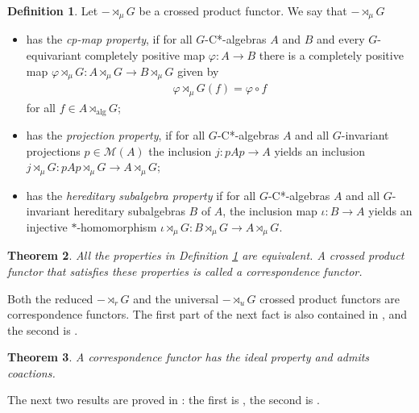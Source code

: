 \documentclass[12pt]{amsart}
\newtheorem{thm}{Theorem}[section]
\theoremstyle{definition}
\newtheorem{defn}[thm]{Definition}
\theoremstyle{remark}
\numberwithin{equation}{section}
\begin{document}
\begin{defn}\label{defn:correspondence}
	Let $-\rtimes_\mu G$  be a crossed product functor. We say that $-\rtimes_\mu G$
	\begin{itemize}
		\item[(i)] has the \emph{cp-map property}, if for all $G$-C*-algebras $A$ and $B$ and every $G$-equivariant completely positive map
		$\varphi\colon A\to B$  there is a completely positive map $\varphi\rtimes_\mu G \colon
		A\rtimes_\mu G \to B\rtimes_\mu G$ given by
		\begin{align*}
			\varphi\rtimes_\mu G (f) = \varphi\circ f
		\end{align*}
		for all $f\in A\rtimes_{\mathrm{alg}}G$;
		\item[(ii)]  has the \emph{projection property}, if for all $G$-C*-algebras
		$A$ and all $G$-invariant projections $p \in \mathcal{M}(A)$ the inclusion
		$j\colon pAp \to A$ yields an inclusion $j\rtimes_\mu G\colon pAp\rtimes_\mu G \to A\rtimes_\mu G$;
		\item[(iii)]  has the \emph{hereditary subalgebra property}  if for all
		$G$-C*-algebras $A$ and all $G$-invariant hereditary subalgebras $B$ of $A$, the inclusion map
		$\iota\colon B \to A$ yields an injective $*$-homomorphism
		$\iota\rtimes_\mu G\colon B\rtimes_\mu G \to A\rtimes_\mu G$.
	\end{itemize}
\end{defn}



\begin{thm}\cite[Theorem 4.9]{BEW} \label{thm:char_correspondence_func}
	All the properties in Definition \ref{defn:correspondence} are equivalent. A crossed product
	functor that satisfies these  properties  is
	called a \emph{correspondence functor}.
\end{thm}

Both the reduced $-\rtimes_r G $ and the universal $-\rtimes_u G$ crossed product functors are correspondence functors. The first part of the next fact is also contained in \cite[Theorem 4.9]{BEW}, and the second is \cite[Theorem 5.6]{BEW}.

\begin{thm}
	A correspondence functor has the ideal property and admits coactions.
\end{thm}

The next two results are proved in \cite{AEES}: the first is \cite[Proposition 2.8]{AEES}, the second is \cite[Lemma 2.10]{AEES}.
\end{document}

